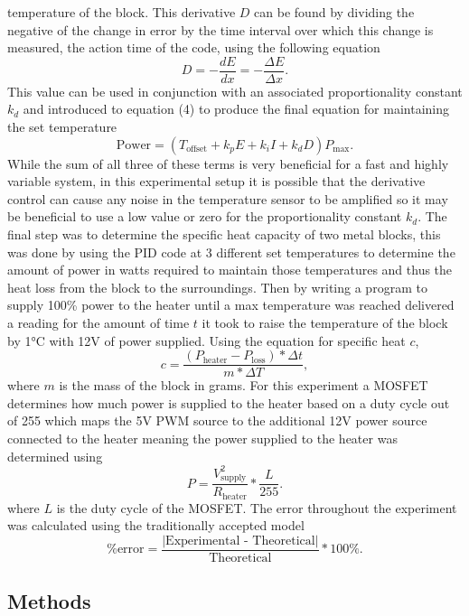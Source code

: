 \documentclass[11pt]{article}
\begin{document}
temperature of the block. This derivative \(D\) can be found by dividing
the negative of the change in error by the time interval over which this
change is measured, the action time of the code, using the following
equation
\[D = - \frac{dE}{dx} = - \frac{\Delta{E}}{\Delta{x}}. \tag{5}\] This
value can be used in conjunction with an associated proportionality
constant \(k_d\) and introduced to equation (4) to produce the final
equation for maintaining the set temperature
\[\text{Power} = ( T_{\text{offset}} + k_p E + k_i I + k_d D) P_{\text{max}}. \tag{6}\]
While the sum of all three of these terms is very beneficial for a fast
and highly variable system, in this experimental setup it is possible
that the derivative control can cause any noise in the temperature
sensor to be amplified so it may be beneficial to use a low value or
zero for the proportionality constant \(k_d\). The final step was to
determine the specific heat capacity of two metal blocks, this was done
by using the PID code at 3 different set temperatures to determine the
amount of power in watts required to maintain those temperatures and
thus the heat loss from the block to the surroundings. Then by writing a
program to supply 100\% power to the heater until a max temperature was
reached delivered a reading for the amount of time \(t\) it took to
raise the temperature of the block by 1°C with 12V of power supplied.
Using the equation for specific heat \(c\),
\[ c = \frac{(P_{\text{heater}} - P_{\text{loss}}) * \Delta{t}}{m * \Delta{T}}, \tag{7}\]
where \(m\) is the mass of the block in grams. For this experiment a
MOSFET determines how much power is supplied to the heater based on a
duty cycle out of 255 which maps the 5V PWM source to the additional 12V
power source connected to the heater meaning the power supplied to the
heater was determined using
\[ P = \frac{V^2_{\text{supply}}}{R_{\text{heater}}} * \frac{L}{255}. \tag{8}\]
where \(L\) is the duty cycle of the MOSFET. The error throughout the
experiment was calculated using the traditionally accepted model
\[ \text{\%error} = \frac{\text{|Experimental - Theoretical|}}{\text{Theoretical}} * 100\%. \tag{9}\]

    \hypertarget{methods}{%
\subsection{Methods}\label{methods}}
\end{document}
